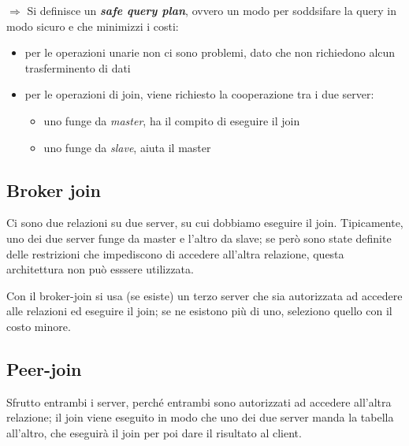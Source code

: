 \documentclass{report}
\begin{document}
\noindent $\Rightarrow$ Si definisce un \textit{\textbf{safe query plan}}, ovvero un modo per soddsifare la query in modo 
sicuro e che minimizzi i costi:
\begin{itemize}
    \item per le operazioni unarie non ci sono problemi, dato che non richiedono alcun trasferminento di dati 
    \item per le operazioni di join, viene richiesto la cooperazione tra i due server:
    \begin{itemize}
        \item uno funge da \textit{master}, ha il compito di eseguire il join 
        \item uno funge da \textit{slave}, aiuta il master
    \end{itemize}
\end{itemize}

\subsection{Broker join}
Ci sono due relazioni su due server, su cui dobbiamo eseguire il join. Tipicamente, uno 
dei due server funge da master e l'altro da slave; se però sono state definite delle restrizioni 
che impediscono di accedere all'altra relazione, questa architettura non può esssere utilizzata.

\noindent Con il broker-join si usa (se esiste) un terzo server che sia autorizzata ad accedere alle relazioni 
ed eseguire il join; se ne esistono più di uno, seleziono quello con il costo minore.

\subsection{Peer-join}
Sfrutto entrambi i server, perché entrambi sono autorizzati ad accedere all'altra relazione; il join 
viene eseguito in modo che uno dei due server manda la tabella all'altro, che eseguirà il join 
per poi dare il risultato al client.
\end{document}
